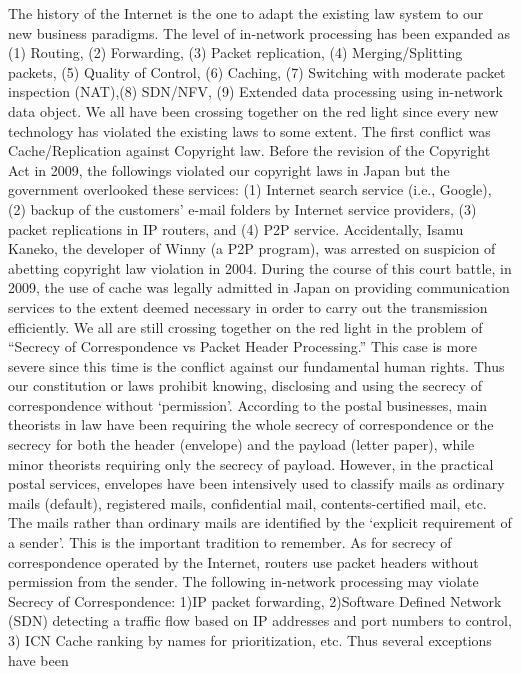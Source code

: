\documentclass[a4paper,UKenglish]{dagrep}
\begin{document}
The history of the Internet is the one to adapt the existing law system
to our new business paradigms. The level of in-network processing has
been expanded as (1) Routing, (2) Forwarding, (3) Packet replication,
(4) Merging/Splitting packets, (5) Quality of Control, (6) Caching, (7)
Switching with moderate packet inspection (NAT),(8) SDN/NFV, (9)
Extended data processing using in-network data object. We all have been
crossing together on the red light since every new technology has
violated the existing laws to some extent.
The first conflict was Cache/Replication against Copyright law. Before
the revision of the Copyright Act in 2009, the followings violated our
copyright laws in Japan but the government overlooked these services: (1)
Internet search service (i.e., Google), (2) backup of the customers’ e-mail
folders by Internet service providers, (3) packet replications in IP
routers, and (4) P2P service. Accidentally, Isamu Kaneko, the developer
of Winny (a P2P program), was arrested on suspicion of abetting
copyright law violation in 2004. During the course of this court battle,
in 2009, the use of cache was legally admitted in Japan on providing
communication services to the extent deemed necessary in order to carry
out the transmission efficiently.
We all are still crossing together on the red light in the problem of
“Secrecy of Correspondence vs Packet Header Processing.” This case is
more severe since this time is the conflict against our fundamental
human rights. Thus our constitution or laws prohibit knowing, disclosing
and using the secrecy of correspondence without ‘permission’.
According to the postal businesses, main theorists in law have been
requiring the whole secrecy of correspondence or the secrecy for both
the header (envelope) and the payload (letter paper), while minor
theorists requiring only the secrecy of payload. However, in the
practical postal services, envelopes have been intensively used to
classify mails as ordinary mails (default), registered mails,
confidential mail, contents-certified mail, etc. The mails rather than
ordinary mails are identified by the ‘explicit requirement of a sender’.
This is the important tradition to remember.
As for secrecy of correspondence operated by the Internet, routers use
packet headers without permission from the sender. The following
in-network processing may violate Secrecy of Correspondence: 1)IP packet
forwarding, 2)Software Defined Network (SDN) detecting a traffic flow
based on IP addresses and port numbers to control, 3) ICN Cache ranking
by names for prioritization, etc. Thus several exceptions have been
\end{document}
